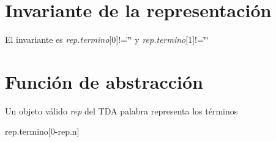 \hypertarget{repConjuntoTraductor_invConjunto}{}\section{Invariante de la representación}\label{repConjuntoTraductor_invConjunto}
El invariante es {\itshape rep.\-termino}\mbox{[}0\mbox{]}!=\char`\"{}\char`\"{} y {\itshape rep.\-termino}\mbox{[}1\mbox{]}!=\char`\"{}\char`\"{}\hypertarget{repConjuntoTraductor_faConjunto}{}\section{Función de abstracción}\label{repConjuntoTraductor_faConjunto}
Un objeto válido {\itshape rep} del T\-D\-A palabra representa los términos

rep.\-termino\mbox{[}0-\/rep.\-n\mbox{]} 